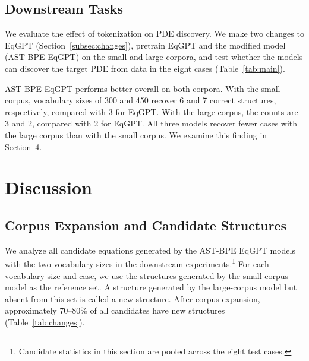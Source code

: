 \documentclass[11pt,letterpaper]{article}
\begin{document}
\FloatBarrier
\subsection{Downstream Tasks}
We evaluate the effect of tokenization on PDE discovery. We make two changes to EqGPT (Section~\ref{subsec:changes}), pretrain EqGPT and the modified model (AST-BPE EqGPT) on the small and large corpora, and test whether the models can discover the target PDE from data in the eight cases (Table~\ref{tab:main}).

AST-BPE EqGPT performs better overall on both corpora. With the small corpus, vocabulary sizes of 300 and 450 recover 6 and 7 correct structures, respectively, compared with 3 for EqGPT. With the large corpus, the counts are 3 and 2, compared with 2 for EqGPT. All three models recover fewer cases with the large corpus than with the small corpus. We examine this finding in Section~4.

\begin{table}[H]
\caption[Discovery results for eight cases]{Discovery results for eight cases\protect\footnotemark. Each cell reports Top1 correctness followed by whether Top10 contains the correct structure.  denotes success and  failure. CD: convection--diffusion; KG: Klein--Gordon; E6: Eq.\ 6.2.12; PD: PDE-divide; CI: Chaffee--Infante. Totals give the number of successful cases for each metric; group maxima are bold.}\label{tab:main}
\centering\fontsize{8.5}{10}\selectfont\setlength{\tabcolsep}{2pt}
\end{table}




\begingroup
\setlength{\intextsep}{2pt}
\setlength{\textfloatsep}{5pt}
\setlength{\floatsep}{4pt}
\setlength{\abovedisplayskip}{5pt}
\setlength{\belowdisplayskip}{5pt}
\setlength{\abovedisplayshortskip}{3pt}
\setlength{\belowdisplayshortskip}{3pt}
\section{Discussion}
\subsection{Corpus Expansion and Candidate Structures}
We analyze all candidate equations generated by the AST-BPE EqGPT models with the two vocabulary sizes in the downstream experiments.\footnote{Candidate statistics in this section are pooled across the eight test cases.} For each vocabulary size and case, we use the structures generated by the small-corpus model as the reference set. A structure generated by the large-corpus model but absent from this set is called a new structure. After corpus expansion, approximately 70--80\% of all candidates have new structures (Table~\ref{tab:changes}).
\begin{table}[H]
\caption{New structures generated by the large-corpus models.}\label{tab:changes}
\centering\small
\end{table}
\end{document}
